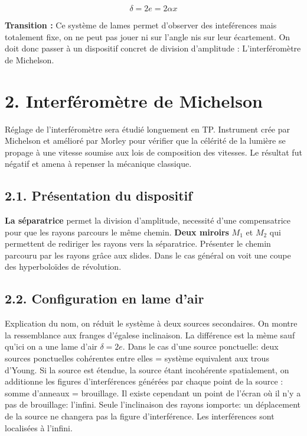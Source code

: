 \documentclass[french, a4paper, 10pt, twocolumn, landscape]{article}
\begin{document}
\begin{equation}
	\delta = 2e = 2\alpha x
\end{equation}

\textbf{Transition :} Ce système de lames permet d'observer des inteférences mais totalement fixe, on ne peut pas jouer ni sur l'angle nis sur leur écartement. On doit donc passer à un dispositif concret de division d'amplitude : L'interféromètre de Michelson.

\section*{2. Interféromètre de Michelson}

Réglage de l'interféromètre sera étudié longuement en TP. Instrument crée par Michelson et amélioré par Morley pour vérifier que la célérité de la lumière se propage à une vitesse soumise aux lois de composition des vitesses. Le résultat fut négatif et amena à repenser la mécanique classique.
\subsection*{2.1. Présentation du dispositif}

\textbf{La séparatrice} permet la division d'amplitude, necessité d'une compensatrice pour que les rayons parcours le même chemin. \textbf{Deux miroirs} $M_1$ et $M_2$ qui permettent de rediriger les rayons vers la séparatrice. Présenter le chemin parcouru par les rayons grâce aux slides. Dans le cas général on voit une coupe des hyperboloïdes de révolution. 


\subsection*{2.2. Configuration en lame d'air}
Explication du nom, on réduit le système à deux sources secondaires. On montre la ressemblance aux franges d'égalese inclinaison. La différence est la mème sauf qu'ici on a une lame d'air $\delta = 2e$. Dans le cas d'une source ponctuelle: deux sources ponctuelles cohérentes entre elles = système 
equivalent aux trous d'Young. Si la source est étendue, la source étant incohérente spatialement, on additionne les figures d'interférences générées par chaque point de la source : somme d'anneaux = brouillage. Il existe cependant un point de l'écran où il n'y a pas de brouillage: l'infini. Seule l'inclinaison des rayons iomporte: un déplacement de la source ne changera pas la figure d'interférence. Les interférences sont localisées à l'infini. 
\end{document}
